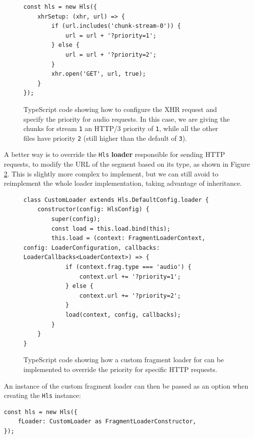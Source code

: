 \begin{figure}[h]
    \centering
    \begin{verbatim}
const hls = new Hls({
    xhrSetup: (xhr, url) => {
        if (url.includes('chunk-stream-0')) {
            url = url + '?priority=1';
        } else {
            url = url + '?priority=2';
        }
        xhr.open('GET', url, true);
    }
});
    \end{verbatim}
    \caption{TypeScript code showing how to configure the XHR request and specify the priority for audio requests. In this case, we are giving the chunks for stream \texttt{1} an HTTP/3 priority of \texttt{1}, while all the other files have priority \texttt{2} (still higher than the default of \texttt{3}).}
    \label{fig:hlsjs_xhrsetup}
\end{figure}

A better way is to override the \texttt{Hls} \textbf{loader} responsible for sending HTTP requests, to modify the URL of the segment based on its type, as shown in Figure \ref{fig:hlsjs_custom_loader}. This is slightly more complex to implement, but we can still avoid to reimplement the whole loader implementation, taking advantage of inheritance.

\begin{figure}
    \centering
    \begin{verbatim}
class CustomLoader extends Hls.DefaultConfig.loader {
    constructor(config: HlsConfig) {
        super(config);
        const load = this.load.bind(this);
        this.load = (context: FragmentLoaderContext, config: LoaderConfiguration, callbacks: LoaderCallbacks<LoaderContext>) => {
            if (context.frag.type === 'audio') {
                context.url += '?priority=1';
            } else {
                context.url += '?priority=2';
            }
            load(context, config, callbacks);
        }
    }
}
\end{verbatim}
    \caption{TypeScript code showing how a custom fragment loader for \hlsjs{} can be implemented to override the priority for specific HTTP requests.}
    \label{fig:hlsjs_custom_loader}
\end{figure}

An instance of the custom fragment loader can then be passed as an option when creating the \texttt{Hls} instance:

\begin{verbatim}
const hls = new Hls({
    fLoader: CustomLoader as FragmentLoaderConstructor,
});
\end{verbatim}

